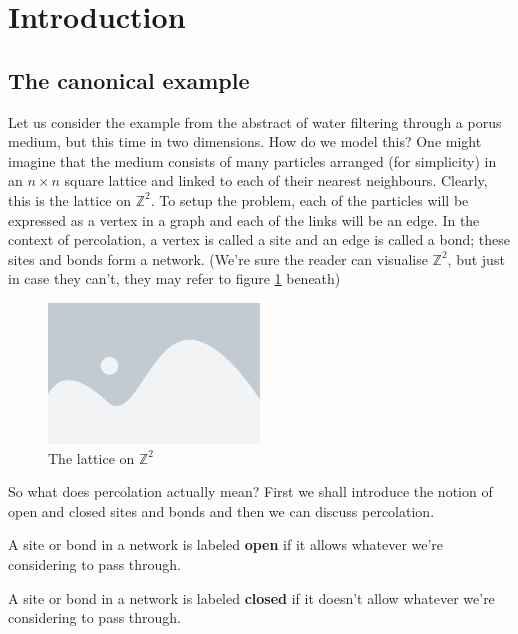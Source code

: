 \section{Introduction}
\subsection{The canonical example}
Let us consider the example from the abstract of water filtering through a porus medium, but this time in two dimensions. How do we model this? One might imagine that the medium consists of
many particles arranged (for simplicity) in an $n \times n$ square lattice and linked to each of their nearest neighbours. Clearly, this is the lattice on $\mathbb{Z}^2$. To setup the problem,
each of the particles will be expressed as a vertex in a graph and each of the links will be an edge. In the context of percolation, a vertex is called a site and an edge is
called a bond; these sites and bonds form a network. (We're sure the reader can visualise $\mathbb{Z}^2$, but just in case they can't, they may refer to figure
\ref{fig:square lattice} beneath) \\

\begin{figure}[h]
  \centering
  \includegraphics[width=0.5\textwidth]{placeholder}
  \caption{The lattice on $\mathbb{Z}^2$}
  \label{fig:square lattice}
\end{figure}

So what does percolation actually mean? First we shall introduce the notion of open and closed sites and bonds and then we can discuss percolation.

\begin{definition}\label{def:open}
  A site or bond in a network is labeled \textbf{open} if it allows whatever we're considering to pass through.
\end{definition}

\begin{definition}\label{def:closed}
  A site or bond in a network is labeled \textbf{closed} if it doesn't allow whatever we're considering to pass through.
\end{definition}

